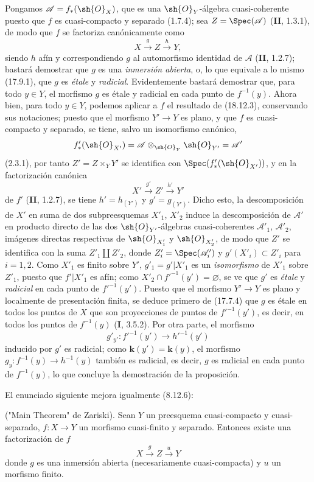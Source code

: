 Pongamos $\mathscr A=f_*(\sh{O}_X)$, que es una $\sh{O}_Y$-álgebra cuasi-coherente puesto que $f$ es cuasi-compacto y separado (1.7.4); sea $Z=\Spec(\mathscr A)$ (\textbf{II}, 1.3.1), de modo que $f$ se factoriza canónicamente como
\[
  X\xrightarrow{g}Z\xrightarrow{h}Y,
\]
siendo $h$ afín y correspondiendo $g$ al automorfismo identidad de $\mathscr A$ (\textbf{II}, 1.2.7); bastará demostrar que $g$ es una \emph{inmersión abierta}, o, lo que equivale a lo mismo (17.9.1), que $g$ es \emph{étale} y \emph{radicial}. Evidentemente bastará demostrar que, para todo $y\in Y$, el morfismo $g$ es étale y radicial en cada punto de $f^{-1}(y)$. Ahora bien, para todo $y\in Y$, podemos aplicar a $f$ el resultado de (18.12.3), conservando sus notaciones; puesto que el morfismo $Y'\to Y$ es plano, y que $f$ es cuasi-compacto y separado, se tiene, salvo un isomorfismo canónico,
\[
  f'_*(\sh{O}_{X'})=\mathscr A\otimes_{\sh{O}_Y}\sh{O}_{Y'}=\mathscr A'
\]
(2.3.1), por tanto $Z'=Z\times_Y Y'$ se identifica con $\Spec(f'_*(\sh{O}_{X'}))$, y en la factorización canónica
\[
  X'\xrightarrow{g'}Z'\xrightarrow{h'}Y'
\]
de $f'$ (\textbf{II}, 1.2.7), se tiene $h'=h_{(Y')}$ y $g'=g_{(Y')}$. Dicho esto, la descomposición de $X'$ en suma de dos subpreesquemas $X'_1$, $X'_2$ induce la descomposición de $\mathscr A'$ en producto directo de las dos $\sh{O}_{Y'}$-álgebras cuasi-coherentes $\mathscr A'_1$, $\mathscr A'_2$, imágenes directas respectivas de $\sh{O}_{X'_1}$ y $\sh{O}_{X'_2}$, de modo que $Z'$ se identifica con la suma $Z'_1\amalg Z'_2$, donde $Z'_i=\Spec(\mathscr A'_i)$ y $g'(X'_i)\subset Z'_i$ para $i=1,2$. Como $X'_1$ es finito sobre $Y'$, $g'_1=g'|X'_1$ es un \emph{isomorfismo} de $X'_1$ sobre $Z'_1$, puesto que $f'|X'_1$ es afín; como $X'_2\cap f'^{-1}(y')=\varnothing$, se ve que $g'$ es \emph{étale} y \emph{radicial} en cada punto de $f'^{-1}(y')$. Puesto que el morfismo $Y'\to Y$ es plano y localmente de presentación finita, se deduce primero de (17.7.4) que $g$ es étale en todos los puntos de $X$ que son proyecciones de puntos de $f'^{-1}(y')$, es decir, en todos los puntos de $f^{-1}(y)$ (\textbf I, 3.5.2). Por otra parte, el morfismo
\[
  g'_{y'}:f'^{-1}(y')\longrightarrow h'^{-1}(y')
\]
inducido por $g'$ es radicial; como $\boldsymbol k(y')=\boldsymbol k(y)$, el morfismo $g_y:f^{-1}(y)\to h^{-1}(y)$ también es radicial, es decir, $g$ es radicial en cada punto de $f^{-1}(y)$, lo que concluye la demostración de la proposición.

El enunciado siguiente mejora igualmente (8.12.6):

\begin{corollary}[18.12.13]
\label{IV.18.12.13}
("Main Theorem" de Zariski). Sean $Y$ un preesquema cuasi-compacto y cuasi-separado, $f:X\to Y$ un morfismo cuasi-finito y separado. Entonces existe una factorización de $f$
\[
  X\xrightarrow{g}Z\xrightarrow{u}Y
\]
donde $g$ es una inmersión abierta (necesariamente cuasi-compacta) y $u$ un morfismo finito.
\end{corollary}

